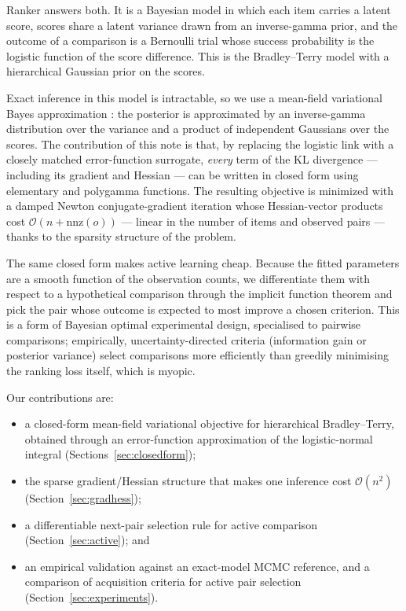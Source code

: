 \documentclass[12pt]{article}
\begin{document}
    Ranker answers both. It is a Bayesian model in which each item carries a latent
    score, scores share a latent variance drawn from an inverse-gamma prior, and the outcome of
    a comparison is a Bernoulli trial whose success probability is the logistic function of the
    score difference. This is the Bradley--Terry model \cite{bradley1952rank} with a
    hierarchical Gaussian prior on the scores.

    Exact inference in this model is intractable, so we use a mean-field variational Bayes
    approximation \cite{blei2017variational}: the posterior is approximated by an inverse-gamma
    distribution over the variance and a product of independent Gaussians over the scores. The
    contribution of this note is that, by replacing the logistic link with a closely matched
    error-function surrogate, \emph{every} term of the KL divergence --- including its gradient
    and Hessian --- can be written in closed form using elementary and polygamma functions. The
    resulting objective is minimized with a damped Newton conjugate-gradient iteration whose
    Hessian-vector products cost $\mathcal{O}(n + \mathrm{nnz}(o))$ --- linear in the number of items
    and observed pairs --- thanks to the sparsity structure of the problem.

    The same closed form makes active learning cheap. Because the fitted parameters are a
    smooth function of the observation counts, we differentiate them with respect to a
    hypothetical comparison through the implicit function theorem and pick the pair whose
    outcome is expected to most improve a chosen criterion. This is a form of Bayesian optimal
    experimental design, specialised to pairwise comparisons; empirically, uncertainty-directed
    criteria (information gain or posterior variance) select comparisons more efficiently than
    greedily minimising the ranking loss itself, which is myopic.

    Our contributions are:
    \begin{itemize}
        \item a closed-form mean-field variational objective for hierarchical Bradley--Terry,
              obtained through an error-function approximation of the logistic-normal integral
              \cite{crooks2009logistic} (Sections~\ref{sec:closedform});
        \item the sparse gradient/Hessian structure that makes one inference cost
              $\mathcal{O}(n^2)$ (Section~\ref{sec:gradhess});
        \item a differentiable next-pair selection rule for active comparison
              (Section~\ref{sec:active}); and
        \item an empirical validation against an exact-model MCMC reference, and a comparison of
              acquisition criteria for active pair selection (Section~\ref{sec:experiments}).
    \end{itemize}
\end{document}
